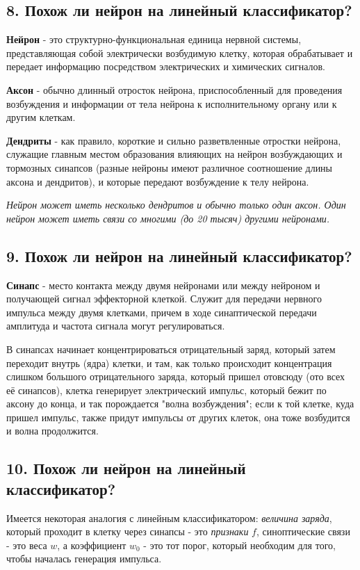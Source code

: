 \subsection{8. Похож ли нейрон на линейный классификатор?}

\textbf{Нейрон} - это структурно-функциональная единица нервной системы,
представляющая собой электрически возбудимую клетку, которая обрабатывает и
передает информацию посредством электрических и химических сигналов.

\textbf{Аксон} - обычно длинный отросток нейрона, приспособленный для проведения
возбуждения и информации от тела нейрона к исполнительному органу или к
другим клеткам.

\textbf{Дендриты} - как правило, короткие и сильно разветвленные отростки
нейрона,
служащие главным местом образования влияющих на нейрон возбуждающих и
тормозных синапсов (разные нейроны имеют различное соотношение длины аксона
и дендритов), и которые передают возбуждение к телу нейрона.

\textit{Нейрон может иметь несколько дендритов и обычно только один аксон.
Один нейрон может иметь связи со многими (до 20 тысяч) другими нейронами.}

\subsection{9. Похож ли нейрон на линейный классификатор?}

\textbf{Синапс} - место контакта между двумя нейронами или между нейроном и
получающей сигнал эффекторной клеткой.
Служит для передачи нервного импульса между двумя клетками, причем в ходе
синаптической передачи амплитуда и частота сигнала могут регулироваться.

В синапсах начинает концентрироваться отрицательный заряд, который затем
переходит внутрь (ядра) клетки, и там, как только происходит концентрация
слишком большого отрицательного заряда, который пришел отовсюду (ото всех
её синапсов), клетка генерирует электрический импульс, который бежит по
аксону до конца, и так порождается "волна возбуждения";
если к той клетке, куда пришел импульс, также придут импульсы от других
клеток, она тоже возбудится и волна продолжится.

\subsection{10. Похож ли нейрон на линейный классификатор?}

Имеется некоторая аналогия с линейным классификатором:
\textit{величина заряда}, который проходит в клетку через синапсы - это \textit{признаки}
$f$, синоптические связи - это веса $w$, а коэффициент $w_0$ - это тот
порог, который необходим для того, чтобы началась генерация импульса.

